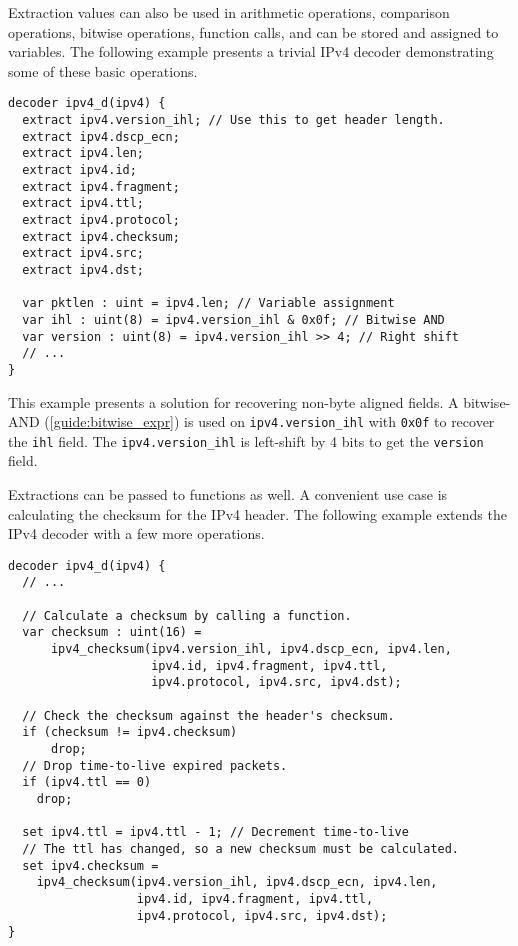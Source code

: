 Extraction values can also be used in arithmetic operations, comparison 
operations, bitwise operations, function calls,
and can be stored and assigned to variables. The following example presents
a trivial IPv4 decoder demonstrating some of these basic operations.

\begin{codepage}
\begin{lstlisting}
decoder ipv4_d(ipv4) {
  extract ipv4.version_ihl; // Use this to get header length.
  extract ipv4.dscp_ecn;
  extract ipv4.len;
  extract ipv4.id;
  extract ipv4.fragment;
  extract ipv4.ttl;
  extract ipv4.protocol;
  extract ipv4.checksum;
  extract ipv4.src;
  extract ipv4.dst;

  var pktlen : uint = ipv4.len; // Variable assignment
  var ihl : uint(8) = ipv4.version_ihl & 0x0f; // Bitwise AND
  var version : uint(8) = ipv4.version_ihl >> 4; // Right shift
  // ...
}
\end{lstlisting}
\end{codepage}

This example presents a solution for recovering non-byte aligned
fields. A bitwise-AND (\ref{guide:bitwise_expr}) is used on \texttt{ipv4.version\_ihl}
with \texttt{0x0f} to recover the \texttt{ihl} field. The 
\texttt{ipv4.version\_ihl} is left-shift by 4 bits to get the \texttt{version} field.

Extractions can be passed to functions as well. A convenient use case is 
calculating the checksum for the IPv4 header. 
The following example extends the IPv4 decoder with a few more operations.

\begin{codepage}
\begin{lstlisting}
decoder ipv4_d(ipv4) {
  // ...
  
  // Calculate a checksum by calling a function.
  var checksum : uint(16) =
      ipv4_checksum(ipv4.version_ihl, ipv4.dscp_ecn, ipv4.len, 
                    ipv4.id, ipv4.fragment, ipv4.ttl, 
                    ipv4.protocol, ipv4.src, ipv4.dst);

  // Check the checksum against the header's checksum.
  if (checksum != ipv4.checksum)
	  drop;
  // Drop time-to-live expired packets.
  if (ipv4.ttl == 0)
    drop;

  set ipv4.ttl = ipv4.ttl - 1; // Decrement time-to-live
  // The ttl has changed, so a new checksum must be calculated.
  set ipv4.checksum =
    ipv4_checksum(ipv4.version_ihl, ipv4.dscp_ecn, ipv4.len, 
                  ipv4.id, ipv4.fragment, ipv4.ttl, 
                  ipv4.protocol, ipv4.src, ipv4.dst);
}
\end{lstlisting}
\end{codepage}

